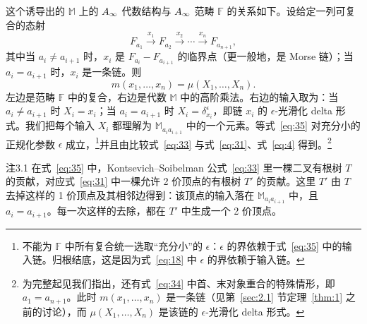 
这个诱导出的 $\mathbb{M}$ 上的 $A_\infty$ 代数结构与 $A_\infty$ 范畴 $\mathbb{F}$ 的关系如下。设给定一列可复合的态射
\begin{equation}\tag{34}\label{eq:34}
F_{a_1}\xrightarrow{x_1}F_{a_2}\xrightarrow{x_2}\cdots\xrightarrow{x_n}F_{a_{n+1}},
\end{equation}
其中当 $a_i\neq a_{i+1}$ 时，$x_i$ 是 $F_{a_i}-F_{a_{i+1}}$ 的临界点（更一般地，是 Morse 链）；当 $a_i=a_{i+1}$ 时，$x_i$ 是一条链。则
\begin{equation}\tag{35}\label{eq:35}
m(x_1,\dots,x_n)=\mu(X_1,\dots,X_n).
\end{equation}
左边是范畴 $\mathbb{F}$ 中的复合，右边是代数 $\mathbb{M}$ 中的高阶乘法。右边的输入取为：当 $a_i\neq a_{i+1}$ 时 $X_i=x_i$；当 $a_i=a_{i+1}$ 时 $X_i=\delta^{\epsilon}_{x_i}$，即链 $x_i$ 的 $\epsilon$-光滑化 delta 形式。我们把每个输入 $X_i$ 都理解为 $\mathbb{M}_{a_ia_{i+1}}$ 中的一个元素。等式~\eqref{eq:35} 对充分小的正规化参数 $\epsilon$ 成立，\footnote{不能为 $\mathbb{F}$ 中所有复合统一选取“充分小”的 $\epsilon$：$\epsilon$ 的界依赖于式~\eqref{eq:35} 中的输入链。归根结底，这是因为式~\eqref{eq:18} 中 $\epsilon$ 的界依赖于输入链。}并且由比较式~\eqref{eq:33} 与式~\eqref{eq:31}、式~\eqref{eq:4} 得到。\footnote{为完整起见我们指出，还有式~\eqref{eq:34} 中首、末对象重合的特殊情形，即 $a_1=a_{n+1}$。此时 $m(x_1,\dots,x_n)$ 是一条链（见第~\ref{sec:2.1} 节定理~\ref{thm:1} 之前的讨论），而 $\mu(X_1,\dots,X_n)$ 是该链的 $\epsilon$-光滑化 delta 形式。}


\begin{thmenv}{注}{3.1}\label{rem:3.1}
在式~\eqref{eq:35} 中，Kontsevich--Soibelman 公式~\eqref{eq:33} 里一棵二叉有根树 $T$ 的贡献，对应式~\eqref{eq:31} 中一棵允许 2 价顶点的有根树 $T'$ 的贡献。这里 $T'$ 由 $T$ 去掉这样的 1 价顶点及其相邻边得到：该顶点的输入落在 $\mathbb{M}_{a_ia_{i+1}}$ 中，且 $a_i=a_{i+1}$。每一次这样的去除，都在 $T'$ 中生成一个 2 价顶点。
\end{thmenv}

